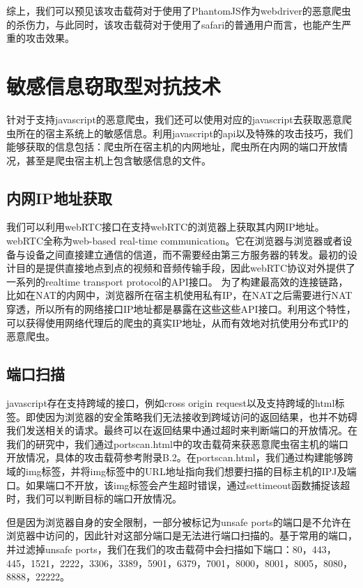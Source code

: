 \documentclass[doctor,privacy,twoside]{buaa_mac}
\begin{document}
综上，我们可以预见该攻击载荷对于使用了PhantomJS作为webdriver的恶意爬虫的杀伤力，与此同时，该攻击载荷对于使用了safari的普通用户而言，也能产生严重的攻击效果。



\section{敏感信息窃取型对抗技术}

针对于支持javascript的恶意爬虫，我们还可以使用对应的javascript去获取恶意爬虫所在的宿主系统上的敏感信息。利用javascript的api以及特殊的攻击技巧，我们能够获取的信息包括：爬虫所在宿主机的内网地址，爬虫所在内网的端口开放情况，甚至是爬虫宿主机上包含敏感信息的文件。


\subsection{内网IP地址获取}
我们可以利用webRTC接口在支持webRTC的浏览器上获取其内网IP地址。webRTC全称为web-based real-time communication。它在浏览器与浏览器或者设备与设备之间直接建立通信的信道，而不需要经由第三方服务器的转发。最初的设计目的是提供直接地点到点的视频和音频传输手段，因此webRTC协议对外提供了一系列的realtime transport protocol的API接口。
为了构建最高效的连接链路，比如在NAT的内网中，浏览器所在宿主机使用私有IP，在NAT之后需要进行NAT穿透，所以所有的网络接口IP地址都是暴露在这些这些API接口。利用这个特性，可以获得使用网络代理后的爬虫的真实IP地址，从而有效地对抗使用分布式IP的恶意爬虫。

\subsection{端口扫描}
javascript存在支持跨域的接口，例如cross origin request以及支持跨域的html标签。即使因为浏览器的安全策略我们无法接收到跨域访问的返回结果，也并不妨碍我们发送相关的请求。最终可以在返回结果中通过超时来判断端口的开放情况。在我们的研究中，我们通过portscan.html中的攻击载荷来获恶意爬虫宿主机的端口开放情况，具体的攻击载荷参考附录B.2。在portscan.html，我们通过构建能够跨域的img标签，并将img标签中的URL地址指向我们想要扫描的目标主机的IPJ及端口。如果端口不开放，该img标签会产生超时错误，通过settimeout函数捕捉该超时，我们可以判断目标的端口开放情况。

但是因为浏览器自身的安全限制，一部分被标记为unsafe ports的端口是不允许在浏览器中访问的，因此针对这部分端口是无法进行端口扫描的。基于常用的端口，并过滤掉unsafe ports，我们在我们的攻击载荷中会扫描如下端口：80，443，445，1521，2222，3306，3389，5901，6379，7001，8000，8001，8005，8080，8888，22222。
\end{document}

